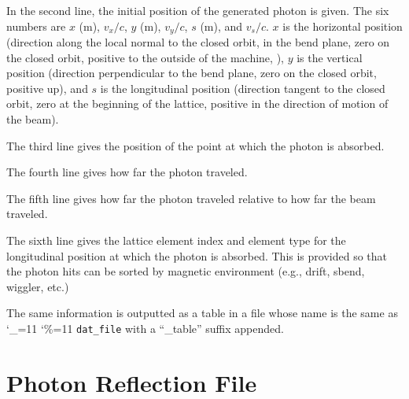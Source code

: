 \documentclass[11pt,openany]{report}
\newcommand\ttcmd{\begingroup\catcode`\_=11 \catcode`\%=11 \dottcmd}
\newcommand\dottcmd[1]{\texttt{#1}\endgroup}
\newcommand{\vn}{\ttcmd}
\begin{document}
{{In the second line, the initial position of the generated photon is
given. The six numbers are $x$ (m), $v_x/c$, $y$ (m), $v_y/c$, $s$
(m), and $v_s/c.$ $x$ is the horizontal position (direction along the
local normal to the closed orbit, in the bend plane, zero on the
closed orbit, positive to the outside of the machine, ), $y$ is the
vertical position (direction perpendicular to the bend plane, zero on
the closed orbit, positive up), and $s$ is the longitudinal position
(direction tangent to the closed orbit, zero at the beginning of the
lattice, positive in the direction of motion of the beam).

The third line gives the position of the point at which the photon is absorbed.

The fourth line gives how far the photon traveled.

The fifth line gives how far the photon traveled relative to how far the beam traveled.

The sixth line gives the lattice element index and element type for
the longitudinal position at which the photon is absorbed. This is
provided so that the photon hits can be sorted by magnetic environment
(e.g., drift, sbend, wiggler, etc.)  

The same information is outputted as a table in a file whose name is
the same as \vn{dat_file} with a ``_table'' suffix appended.

\section{Photon Reflection File}
\label{ss:reflection.file}

}}
\end{document}
